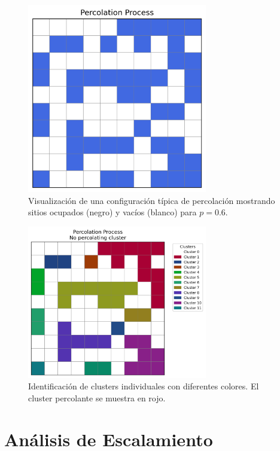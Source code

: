 \documentclass[11pt,a4paper]{article}
\begin{document}
\begin{figure}[H]
    \centering
    \includegraphics[width=0.7\textwidth]{../figures/percolation.png}
    \caption{Visualización de una configuración típica de percolación mostrando sitios ocupados (negro) y vacíos (blanco) para $p = 0.6$.}
    \label{fig:visualization}
\end{figure}

\begin{figure}[H]
    \centering
    \includegraphics[width=0.7\textwidth]{../figures/clusterpercolation.png}
    \caption{Identificación de clusters individuales con diferentes colores. El cluster percolante se muestra en rojo.}
    \label{fig:cluster_vis}
\end{figure}

\section{Análisis de Escalamiento}
\end{document}
